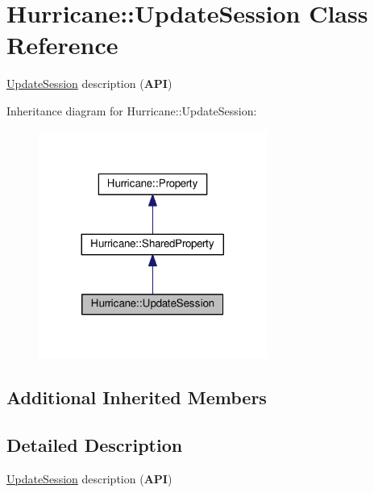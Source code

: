 \hypertarget{classHurricane_1_1UpdateSession}{}\section{Hurricane\+:\+:Update\+Session Class Reference}
\label{classHurricane_1_1UpdateSession}


\mbox{\hyperlink{classHurricane_1_1UpdateSession}{Update\+Session}} description ({\bfseries A\+PI})  




Inheritance diagram for Hurricane\+:\+:Update\+Session\+:\nopagebreak
\begin{figure}[H]
\begin{center}
\leavevmode
\includegraphics[width=212pt]{classHurricane_1_1UpdateSession__inherit__graph}
\end{center}
\end{figure}
\subsection*{Additional Inherited Members}


\subsection{Detailed Description}
\mbox{\hyperlink{classHurricane_1_1UpdateSession}{Update\+Session}} description ({\bfseries A\+PI}) 


